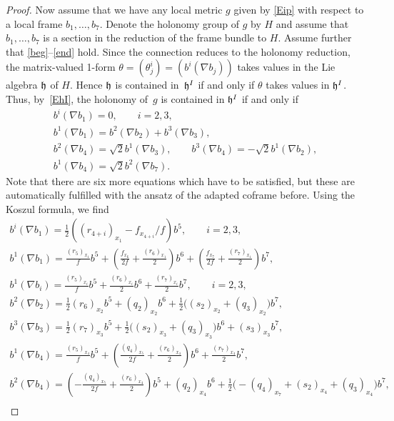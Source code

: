\documentclass[11pt]{article}
\numberwithin{equation}{section}
\newcommand\fh{{\frak h}}
\begin{document}
\begin{proof}
Now assume that we have any local metric $g$ given by \eqref{Eip} with respect to a local frame $b_1,\dots,b_7$. Denote the holonomy group of $g$ by $H$ and assume that $b_1,\dots,b_7$ is a section in the reduction of the frame bundle to $H$. Assume further that \eqref{beg}--\eqref{end} hold. Since the connection reduces to the holonomy reduction, the matrix-valued 1-form $\theta=(\theta^i_j)=(b^i(\nabla b_j))$ takes values in the Lie algebra $\fh$ of $H$. Hence $\fh $ is contained in~$\fh^I$ if and only if $\theta$ takes values in $\fh^I$. Thus, by~\eqref{EhI}, the holonomy of~$g$ is contained in $\fh^I$ if and only if
\begin{gather}
 b^i(\nabla b_{1})=0,\qquad i=2,3, \label{Es1}\\
 b^1(\nabla b_1)=b^2(\nabla b_2)+b^3(\nabla b_3), \label{Es2}\\
 b^2(\nabla b_4)=\sqrt 2 b^1(\nabla b_3),\qquad b^3(\nabla b_4)=-\sqrt 2 b^1(\nabla b_2), \label{Es3}\\
 b^1(\nabla b_4)=\sqrt 2b^2(\nabla b_7). \label{Es4}
\end{gather}
Note that there are six more equations which have to be satisfied, but these are automatically fulfilled with the ansatz of the adapted coframe before. Using the Koszul formula, we find
\begin{gather*}
b^i(\nabla b_{1}) = \tfrac12 ((r_{4+i})_{x_1}- f_{x_{4+i}}/{f}) b^5 ,\qquad i=2,3,\label{En1}\\
b^1(\nabla b_1) = \tfrac{(r_5)_{x_1}}{f} b^5 +\left(\tfrac{f_{x_6}}{2f}+\tfrac{(r_6)_{x_1}}{2}\right) b^6+\left(\tfrac{f_{x_7}}{2f}+\tfrac{(r_7)_{x_1}}{2}\right) b^7, \label{En2}\\
b^{1}(\nabla b_{i}) = \tfrac{(r_5)_{x_i}}f b^5 + \tfrac{ (r_6)_{x_i}}2 b^6 + \tfrac{(r_7)_{x_i}}2 b^7,\qquad i=2,3,\label{En2a}\\
b^{2}(\nabla b_{2}) = \tfrac12 (r_6)_{x_2} b^5+(q_2)_{x_2} b^6+\tfrac12\big((s_2)_{x_2}+(q_3)_{x_2}\big) b^7, \label{En3}\\
b^3(\nabla b_3) = \tfrac12 (r_7)_{x_3} b^5+\tfrac12\big((s_2)_{x_3}+(q_3)_{x_3}\big) b^6+(s_3)_{x_3} b^7 , \label{En4}\\
b^1(\nabla b_4) = \tfrac{(r_5)_{x_4}}{f} b^5 +\left(\tfrac{(q_4)_{x_5}}{2f}+\tfrac{(r_6)_{x_4}}{2}\right) b^6+ \tfrac{(r_7)_{x_4}}{2} b^7 , \label{En5} \\
b^2(\nabla b_4) = \left(-\tfrac{(q_4)_{x_5}}{2f}+\tfrac{(r_6)_{x_4}}{2}\right)b^5+ (q_2)_{x_4} b^6 + \tfrac12 \big({-}(q_4)_{x_7}+(s_2)_{x_4}+(q_3)_{x_4}\big) b^7 ,\label{En6}\\

\end{gather*}
\end{proof}
\end{document}
